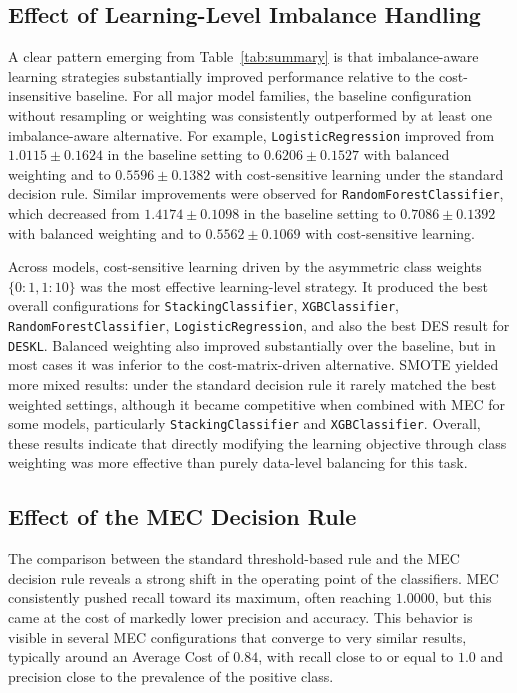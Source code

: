\documentclass[conference]{IEEEtran}
\begin{document}
\subsection{Effect of Learning-Level Imbalance Handling}

A clear pattern emerging from Table~\ref{tab:summary} is that imbalance-aware learning strategies substantially improved performance relative to the cost-insensitive baseline. For all major model families, the baseline configuration without resampling or weighting was consistently outperformed by at least one imbalance-aware alternative. For example, \texttt{LogisticRegression} improved from \(1.0115 \pm 0.1624\) in the baseline setting to \(0.6206 \pm 0.1527\) with balanced weighting and to \(0.5596 \pm 0.1382\) with cost-sensitive learning under the standard decision rule. Similar improvements were observed for \texttt{RandomForestClassifier}, which decreased from \(1.4174 \pm 0.1098\) in the baseline setting to \(0.7086 \pm 0.1392\) with balanced weighting and to \(0.5562 \pm 0.1069\) with cost-sensitive learning.

Across models, cost-sensitive learning driven by the asymmetric class weights \(\{0:1, 1:10\}\) was the most effective learning-level strategy. It produced the best overall configurations for \texttt{StackingClassifier}, \texttt{XGBClassifier}, \texttt{RandomForestClassifier}, \texttt{LogisticRegression}, and also the best DES result for \texttt{DESKL}. Balanced weighting also improved substantially over the baseline, but in most cases it was inferior to the cost-matrix-driven alternative. SMOTE yielded more mixed results: under the standard decision rule it rarely matched the best weighted settings, although it became competitive when combined with MEC for some models, particularly \texttt{StackingClassifier} and \texttt{XGBClassifier}. Overall, these results indicate that directly modifying the learning objective through class weighting was more effective than purely data-level balancing for this task.

\subsection{Effect of the MEC Decision Rule}

The comparison between the standard threshold-based rule and the MEC decision rule reveals a strong shift in the operating point of the classifiers. MEC consistently pushed recall toward its maximum, often reaching \(1.0000\), but this came at the cost of markedly lower precision and accuracy. This behavior is visible in several MEC configurations that converge to very similar results, typically around an Average Cost of \(0.84\), with recall close to or equal to \(1.0\) and precision close to the prevalence of the positive class.
\end{document}
